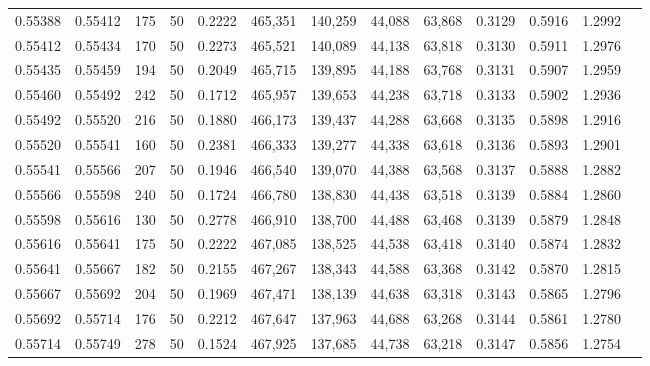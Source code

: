 \begin{tabular}{rrrrrrrrrrrrr}
0.55388 & 0.55412 &   175 &  50 &                                     0.2222 & 465,351 & 140,259 &  44,088 &  63,868 & 0.3129 & 0.5916 & 1.2992 \\
0.55412 & 0.55434 &   170 &  50 &                                     0.2273 & 465,521 & 140,089 &  44,138 &  63,818 & 0.3130 & 0.5911 & 1.2976 \\
0.55435 & 0.55459 &   194 &  50 &                                     0.2049 & 465,715 & 139,895 &  44,188 &  63,768 & 0.3131 & 0.5907 & 1.2959 \\
0.55460 & 0.55492 &   242 &  50 &                                     0.1712 & 465,957 & 139,653 &  44,238 &  63,718 & 0.3133 & 0.5902 & 1.2936 \\
0.55492 & 0.55520 &   216 &  50 &                                     0.1880 & 466,173 & 139,437 &  44,288 &  63,668 & 0.3135 & 0.5898 & 1.2916 \\
0.55520 & 0.55541 &   160 &  50 &                                     0.2381 & 466,333 & 139,277 &  44,338 &  63,618 & 0.3136 & 0.5893 & 1.2901 \\
0.55541 & 0.55566 &   207 &  50 &                                     0.1946 & 466,540 & 139,070 &  44,388 &  63,568 & 0.3137 & 0.5888 & 1.2882 \\
0.55566 & 0.55598 &   240 &  50 &                                     0.1724 & 466,780 & 138,830 &  44,438 &  63,518 & 0.3139 & 0.5884 & 1.2860 \\
0.55598 & 0.55616 &   130 &  50 &                                     0.2778 & 466,910 & 138,700 &  44,488 &  63,468 & 0.3139 & 0.5879 & 1.2848 \\
0.55616 & 0.55641 &   175 &  50 &                                     0.2222 & 467,085 & 138,525 &  44,538 &  63,418 & 0.3140 & 0.5874 & 1.2832 \\
0.55641 & 0.55667 &   182 &  50 &                                     0.2155 & 467,267 & 138,343 &  44,588 &  63,368 & 0.3142 & 0.5870 & 1.2815 \\
0.55667 & 0.55692 &   204 &  50 &                                     0.1969 & 467,471 & 138,139 &  44,638 &  63,318 & 0.3143 & 0.5865 & 1.2796 \\
0.55692 & 0.55714 &   176 &  50 &                                     0.2212 & 467,647 & 137,963 &  44,688 &  63,268 & 0.3144 & 0.5861 & 1.2780 \\
0.55714 & 0.55749 &   278 &  50 &                                     0.1524 & 467,925 & 137,685 &  44,738 &  63,218 & 0.3147 & 0.5856 & 1.2754 \\

\end{tabular}
